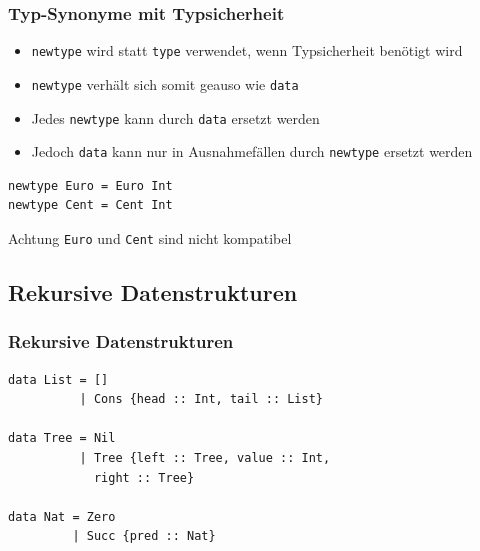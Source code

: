 \begin{frame}[fragile]
\frametitle{Typ-Synonyme mit Typsicherheit} 
\begin{block}{\vspace*{-3ex}}
\begin{itemize}
\item \lstinline|newtype| wird statt \lstinline|type| verwendet, wenn Typsicherheit benötigt wird
\item \lstinline|newtype| verhält sich somit geauso wie \lstinline|data|
\item Jedes \lstinline|newtype| kann durch \lstinline|data| ersetzt werden
\item Jedoch \lstinline|data| kann nur in Ausnahmefällen durch \lstinline|newtype| ersetzt werden
\end{itemize}
\end{block}
\pause
\begin{lstlisting}
newtype Euro = Euro Int
newtype Cent = Cent Int
\end{lstlisting}
\begin{alertblock}{Achtung}
\lstinline|Euro| und \lstinline|Cent| sind nicht kompatibel
\end{alertblock}
\end{frame}

\subsection{Rekursive Datenstrukturen}

\begin{frame}[fragile]
\frametitle{Rekursive Datenstrukturen} 
\begin{lstlisting}
data List = []
          | Cons {head :: Int, tail :: List}

data Tree = Nil
          | Tree {left :: Tree, value :: Int,
            right :: Tree}
          
data Nat = Zero
         | Succ {pred :: Nat}

\end{lstlisting}
\end{frame}

